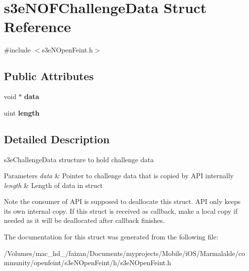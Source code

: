 \hypertarget{structs3e_n_o_f_challenge_data}{
\section{s3eNOFChallengeData Struct Reference}
\label{structs3e_n_o_f_challenge_data}
}


{\ttfamily \#include $<$s3eNOpenFeint.h$>$}

\subsection*{Public Attributes}
\begin{DoxyCompactItemize}
\item 
\hypertarget{structs3e_n_o_f_challenge_data_acb27730e16c5f0db8231c2c47307fd16}{
void $\ast$ {\bfseries data}}
\label{structs3e_n_o_f_challenge_data_acb27730e16c5f0db8231c2c47307fd16}

\item 
\hypertarget{group___n_open_feint_api_group_ga0a8617b1651e0991d5145ac746fadc8a}{
uint {\bfseries length}}
\label{group___n_open_feint_api_group_ga0a8617b1651e0991d5145ac746fadc8a}

\end{DoxyCompactItemize}


\subsection{Detailed Description}
s3eChallengeData structure to hold challenge data 
\begin{DoxyParams}{Parameters}
{\em data} & Pointer to challenge data that is copied by API internally \\
\hline
{\em length} & Length of data in struct \\
\hline
\end{DoxyParams}
\begin{DoxyNote}{Note}
the consumer of API is supposed to deallocate this struct. API only keeps its own internal copy. If this struct is received as callback, make a local copy if needed as it will be deallocated after callback finishes. 
\end{DoxyNote}


The documentation for this struct was generated from the following file:\begin{DoxyCompactItemize}
\item 
/Volumes/mac\_\-hd\_/faizan/Documents/myprojects/Mobile/iOS/Marmalalde/community/openfeint/s3eNOpenFeint/h/s3eNOpenFeint.h\end{DoxyCompactItemize}
